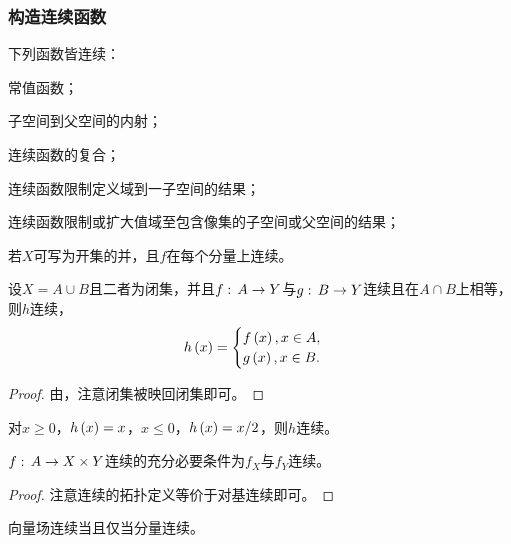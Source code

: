 \documentclass{ctexrep}
\begin{document}
  \subsubsection{构造连续函数}
  \begin{theorem}
    下列函数皆连续：
    \begin{cenum}
      \item 常值函数；
      \item 子空间到父空间的内射；
      \item 连续函数的复合；
      \item 连续函数限制定义域到一子空间的结果；
      \item 连续函数限制或扩大值域至包含像集的子空间或父空间的结果；
      \item 若$X$可写为开集的并，且$f$在每个分量上连续。
    \end{cenum}
  \end{theorem}
  \begin{theorem}[黏结引理]
    设$X=A\cup B$且二者为闭集，并且$f:\, A \rightarrow Y$与$g:\, B \rightarrow Y$连续且在$A\cap B$上相等，则$h$连续，
    \[ h\left(x\right)=\begin{cases}f\left(x\right), x\in A, \\ g\left(x\right), x\in B.\end{cases} \]
  \end{theorem}
  \begin{proof}
    由，注意闭集被映回闭集即可。
  \end{proof}
  \begin{ex}
    对$x\ge 0$，$h\left(x\right)=x$，$x\le 0$，$h\left(x\right)=x/2$，则$h$连续。
  \end{ex}
  \begin{theorem}
    $f:\, A \rightarrow X\times Y$连续的充分必要条件为$f_X$与$f_Y$连续。
  \end{theorem}
  \begin{proof}
    注意连续的拓扑定义等价于对基连续即可。
  \end{proof}
  \begin{ex}
    向量场连续当且仅当分量连续。
  \end{ex}
\end{document}
